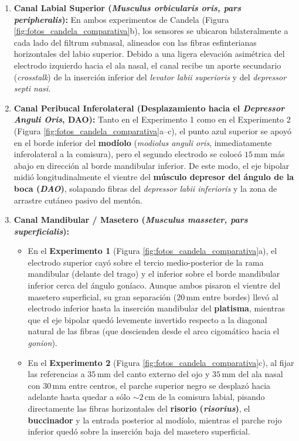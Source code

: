 \documentclass[11pt,a4paper]{article}
\begin{document}
\begin{enumerate}
    \item \textbf{Canal Labial Superior (\textit{Musculus orbicularis oris, pars peripheralis}):} En ambos experimentos de Candela (Figura \ref{fig:fotos_candela_comparativa}b), los sensores se ubicaron bilateralmente a cada lado del filtrum subnasal, alineados con las fibras esfinterianas horizontales del labio superior. Debido a una ligera elevación asimétrica del electrodo izquierdo hacia el ala nasal, el canal recibe un aporte secundario (\textit{crosstalk}) de la inserción inferior del \textit{levator labii superioris} y del \textit{depressor septi nasi}.
    \item \textbf{Canal Peribucal Inferolateral (Desplazamiento hacia el \textit{Depressor Anguli Oris}, DAO):} Tanto en el Experimento 1 como en el Experimento 2 (Figura \ref{fig:fotos_candela_comparativa}a--c), el punto azul superior se apoyó en el borde inferior del \textbf{modíolo} (\textit{modiolus anguli oris}, inmediatamente inferolateral a la comisura), pero el segundo electrodo se colocó $15\,\text{mm}$ más abajo en dirección al borde mandibular inferior. De este modo, el eje bipolar midió longitudinalmente el vientre del \textbf{músculo depresor del ángulo de la boca (\textit{DAO})}, solapando fibras del \textit{depressor labii inferioris} y la zona de arrastre cutáneo pasivo del mentón.
    \item \textbf{Canal Mandibular / Masetero (\textit{Musculus masseter, pars superficialis}):}
    \begin{itemize}
        \item En el \textbf{Experimento 1} (Figura \ref{fig:fotos_candela_comparativa}a), el electrodo superior cayó sobre el tercio medio-posterior de la rama mandibular (delante del trago) y el inferior sobre el borde mandibular inferior cerca del ángulo goníaco. Aunque ambos pisaron el vientre del masetero superficial, su gran separación ($20\,\text{mm}$ entre bordes) llevó al electrodo inferior hasta la inserción mandibular del \textbf{platisma}, mientras que el eje bipolar quedó levemente invertido respecto a la diagonal natural de las fibras (que descienden desde el arco cigomático hacia el \textit{gonion}).
        \item En el \textbf{Experimento 2} (Figura \ref{fig:fotos_candela_comparativa}c), al fijar las referencias a $35\,\text{mm}$ del canto externo del ojo y $35\,\text{mm}$ del ala nasal con $30\,\text{mm}$ entre centros, el parche superior negro se desplazó hacia adelante hasta quedar a sólo $\sim 2\,\text{cm}$ de la comisura labial, pisando directamente las fibras horizontales del \textbf{risorio (\textit{risorius})}, el \textbf{buccinador} y la entrada posterior al modíolo, mientras el parche rojo inferior quedó sobre la inserción baja del masetero superficial.

\end{itemize}
\end{enumerate}
\end{document}
